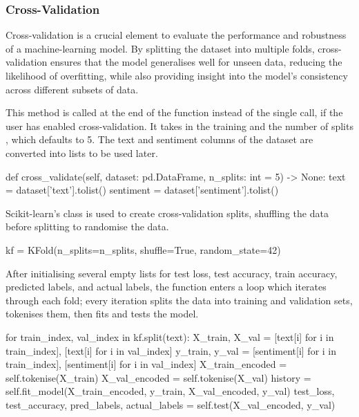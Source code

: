         \subsubsection{Cross-Validation}
        Cross-validation is a crucial element to evaluate the performance and robustness of a machine-learning model. By splitting the dataset into multiple folds, cross-validation ensures that the model generalises well for unseen data, reducing the likelihood of overfitting, while also providing insight into the model's consistency across different subsets of data.

        This method is called at the end of the  function instead of the single  call, if the user has enabled cross-validation. It takes in the training  and the number of splits , which defaults to 5. The text and sentiment columns of the dataset are converted into lists to be used later.

        \begin{python}
def cross_validate(self, dataset: pd.DataFrame, n_splits: int = 5) -> None:
    text = dataset['text'].tolist()
    sentiment = dataset['sentiment'].tolist()
        \end{python}

        Scikit-learn's  class is used to create cross-validation splits, shuffling the data before splitting to randomise the data.

        \begin{python}
kf = KFold(n_splits=n_splits, shuffle=True, random_state=42)
        \end{python}

        After initialising several empty lists for test loss, test accuracy, train accuracy, predicted labels, and actual labels, the function enters a loop which iterates through each fold; every iteration splits the data into training and validation sets, tokenises them, then fits and tests the model.

        \begin{python}
for train_index, val_index in kf.split(text):
    X_train, X_val = [text[i] for i in train_index], [text[i] for i in val_index]
    y_train, y_val = [sentiment[i] for i in train_index], [sentiment[i] for i in val_index]
    X_train_encoded = self.tokenise(X_train)
    X_val_encoded = self.tokenise(X_val)
    history = self.fit_model(X_train_encoded, y_train, X_val_encoded, y_val)
    test_loss, test_accuracy, pred_labels, actual_labels = self.test(X_val_encoded, y_val)
        \end{python}

